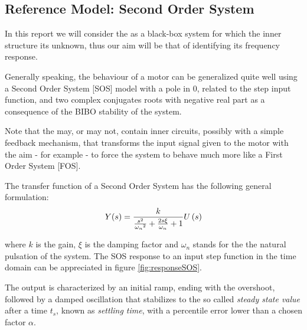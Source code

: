 \subsection{Reference Model: Second Order System}

In this report we will consider the \LEGOMOTOR{} as a black-box system for which the inner structure its unknown, thus our aim will be that of identifying its frequency response.

Generally speaking, the behaviour of a motor can be generalized quite well using a Second Order System [SOS] model with a pole in $0$, related to the step input function, and two complex conjugates roots with negative real part as a consequence of the BIBO stability of the system. 

Note that the \LEGOMOTOR{} may, or may not, contain inner circuits, possibly with a simple feedback mechanism, that transforms the input signal given to the motor with the aim - for example - to force the system to behave much more like a First Order System [FOS].

The transfer function of a Second Order System has the following general formulation:
\begin{equation}
  Y(s) = {{k \over {{s^2 \over {{\omega_n}^2}} + {2s{\xi} \over
        {\omega_n}} + 1}}U\left (s\right )}
\end{equation}\label{eq:responseSOS}

where $k$ is the gain, $\xi$ is the damping factor and $\omega_n$ stands for the the natural pulsation of the system. The SOS response to an input step function in the time domain can be appreciated in figure \ref{fig:responseSOS}. 

The output is characterized by an initial ramp, ending with the overshoot, followed by a damped oscillation that stabilizes to the so called \textit{steady state value} after a time $t_s$, known as \textit{settling time}, with a percentile error lower than a chosen factor $\alpha{}$.

